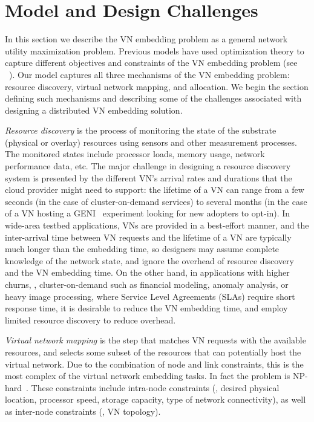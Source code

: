 \documentclass[a4paper, 10pt, conference]{ieeeconf}
\begin{document}
 




\vspace{-1mm}
\section{Model and Design Challenges}\label{sec:model}




In this section we describe the VN embedding problem as a general network utility maximization problem. Previous models have used optimization theory to capture different objectives and constraints of the VN embedding problem (see ~\cite{ChowdhuryTON,Houidi2011}). Our model captures all three mechanisms of the VN embedding problem: resource discovery,  virtual network mapping,  and allocation.  We begin the section defining such mechanisms and describing some of the challenges associated with designing a distributed VN embedding solution.  

\emph{Resource discovery} is the process of monitoring the state of the substrate (physical or overlay) resources using sensors and other measurement processes. The monitored states include processor loads, memory usage, network performance data, etc. 
The major challenge in designing a resource discovery system is presented by the different VN's arrival rates and durations that the cloud provider might need to support: the lifetime of a VN can range from a few seconds (in the case of cluster-on-demand services) to several months (in the case of a VN hosting a GENI~\cite{GENI} experiment looking for new adopters to opt-in). 
In wide-area testbed applications, VNs are provided in a best-effort manner, and the inter-arrival time between VN requests and the lifetime of a VN are typically much longer than the embedding time, so designers may assume complete knowledge of the network state, and ignore the overhead of resource discovery and the VN embedding time. On the other hand, in applications with higher churns, , cluster-on-demand such as financial modeling, anomaly analysis, or heavy image processing, where Service Level Agreements (SLAs) require short response time, it is desirable to reduce the VN embedding time, and employ limited resource discovery to reduce overhead. 



{\it Virtual network mapping} is the step that matches VN requests with the available resources, and selects some subset of the resources that can potentially host the virtual network. 
Due to the combination of node and link constraints, this is the most complex of the virtual network embedding tasks. In fact the problem is NP-hard~\cite{mappingNPhard}. These constraints include intra-node constraints (, desired physical location, processor speed, storage capacity, type of network connectivity), as well as inter-node constraints (, VN topology).
\end{document}
